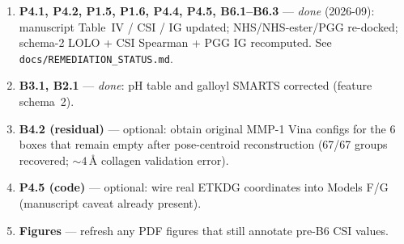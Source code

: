 \documentclass[11pt,a4paper]{article}
\begin{document}
\begin{enumerate}\itemsep2pt
  \item \textbf{P4.1, P4.2, P1.5, P1.6, P4.4, P4.5, B6.1--B6.3} ---
        \emph{done} (2026-09): manuscript Table~IV / CSI / IG updated;
        NHS/NHS-ester/PGG re-docked; schema-2 LOLO + CSI Spearman + PGG IG
        recomputed. See \texttt{docs/REMEDIATION\_STATUS.md}.
  \item \textbf{B3.1, B2.1} --- \emph{done}: pH table and galloyl SMARTS
        corrected (feature schema~2).
  \item \textbf{B4.2 (residual)} --- optional: obtain original MMP-1 Vina
        configs for the 6 boxes that remain empty after pose-centroid
        reconstruction (67/67 groups recovered; ${\sim}4$\,\AA{} collagen
        validation error).
  \item \textbf{P4.5 (code)} --- optional: wire real ETKDG coordinates into
        Models F/G (manuscript caveat already present).
  \item \textbf{Figures} --- refresh any PDF figures that still annotate
        pre-B6 CSI values.
\end{enumerate}
\end{document}
